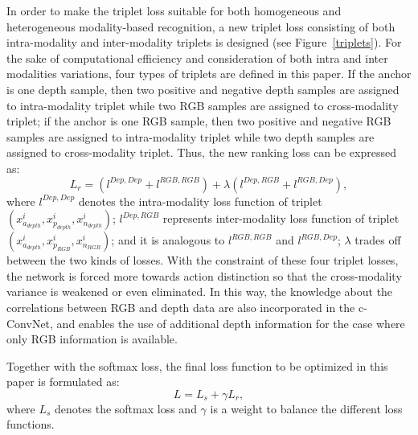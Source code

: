 \documentclass[letterpaper]{article} %
\begin{document}
In order to make the triplet loss suitable for both homogeneous and heterogeneous modality-based recognition,
a new triplet loss consisting of both intra-modality and inter-modality triplets is designed (see Figure~\ref{triplets}). For the sake of computational efficiency and consideration of both intra and inter modalities
variations, four types of triplets are defined in this paper. If the anchor is one depth sample, then two positive and negative depth samples are assigned to intra-modality triplet while
two RGB samples are assigned to cross-modality triplet; if the anchor is one RGB
sample, then two positive and negative RGB samples are assigned to
intra-modality triplet while two depth samples are assigned to cross-modality
triplet.
Thus, the new ranking loss can be expressed as:
\begin{equation}\label{2}
L_{r} = (l^{Dep,Dep} + l^{RGB,RGB}) + \lambda(l^{Dep,RGB} + l^{RGB, Dep}),
\end{equation}
where $l^{Dep,Dep}$ denotes the intra-modality loss function of
triplet $(x_{a_{depth}}^{i},x_{p_{depth}}^{i},x_{n_{depth}}^{i})$; $l^{Dep,RGB}$
represents inter-modality loss function of triplet
$(x_{a_{depth}}^{i},x_{p_{RGB}}^{i},x_{n_{RGB}}^{i})$; and it is analogous
to $l^{RGB,RGB}$ and $l^{RGB, Dep}$; $\lambda$ trades off between the two kinds
of losses. With the constraint of these four triplet losses, the network is
forced more towards action distinction so that the cross-modality variance
is weakened or even eliminated. In this way, the knowledge about the
correlations between RGB and depth data are also incorporated in the c-ConvNet,
and enables the use of additional depth information for the case where only RGB
information is available.


Together with the softmax loss, the final loss function to be optimized in this paper is formulated as:
\begin{equation}\label{3}
L = L_{s} + \gamma L_{r},
\end{equation}
where $L_{s}$ denotes the softmax loss and $\gamma$ is a weight to balance the different loss functions.
\end{document}
